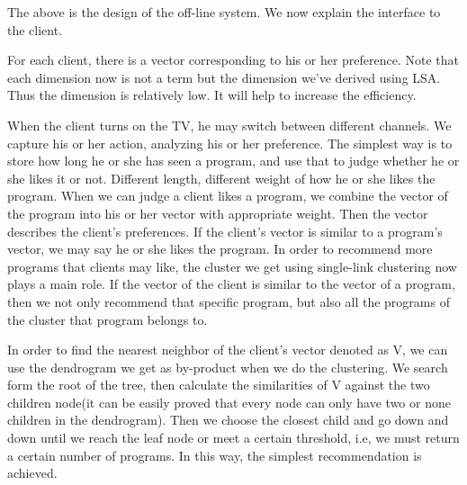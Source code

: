 The above is the design of the off-line system. We now explain the interface to the client.

For each client, there is a vector corresponding to his or her preference. Note that each dimension now is not a term but the dimension we've derived using LSA. Thus the dimension is relatively low. It will help to increase the efficiency.

When the client turns on the TV, he may switch between different channels. We capture his or her action, analyzing his or her preference. The simplest way is to store how long he or she has seen a program, and use that to judge whether he or she likes it or not. Different length, different weight of how he or she likes the program. When we can judge a client likes a program, we combine the vector of the program into his or her vector with appropriate weight. Then the vector describes the client's preferences. If the client's vector is similar to a program's vector, we may say he or she likes the program. In order to recommend more programs that clients may like, the cluster we get using single-link clustering now plays a main role. If the vector of the client is similar to the vector of a program, then we not only recommend that specific program, but also all the  programs of the cluster that program belongs to.

In order to find the nearest neighbor of the client's vector denoted as V, we can use the dendrogram we get as by-product when we do the clustering. We search form the root of the tree, then calculate the similarities of V against the two children node(it can be easily proved that every node can only have two or none children in the dendrogram). Then we choose the closest child and go down and down until we reach the leaf node or meet a certain threshold, i.e, we must return a certain number of programs. In this way, the simplest recommendation is achieved.

